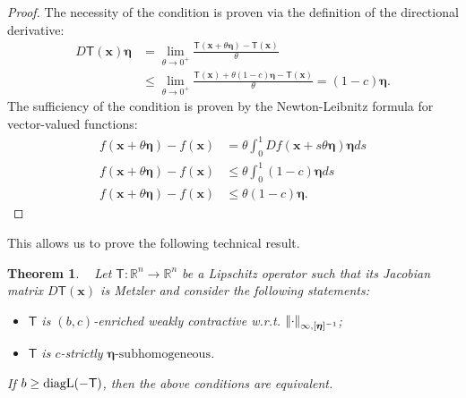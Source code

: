 \documentclass[journal,twoside,web]{ieeecolor}
\newcommand{\norm}[1]{{\left\vert\kern-0.25ex\left\vert #1\right\vert\kern-0.25ex\right\vert}}
\newcommand{\rea }{\mathbb{R}}
\newcommand{\xb}{\boldsymbol{x}}
\newcommand{\etab}{\boldsymbol{\eta}}
\newcommand{\Ts}{\mathsf{T}}
\newtheorem{thm}{Theorem}
\begin{document}
\begin{proof}
    The necessity of the condition is proven via the definition of the directional derivative:
    $$
    \begin{aligned}
    D\Ts(\xb)\etab & = \lim_{\theta\rightarrow 0^+} \frac{\Ts(\xb+\theta\etab) - \Ts(\xb)}{\theta}\\
    & \leq \lim_{\theta\rightarrow 0^+} \frac{\Ts(\xb) + \theta(1-c)\etab - \Ts(\xb)}{\theta} = (1-c)\etab.
    \end{aligned}
    $$
    The sufficiency of the condition is proven by the Newton-Leibnitz formula for vector-valued functions:
    $$
    \begin{aligned}
    f(\xb+\theta\etab) - f(\xb) & = \theta\int_0^1 Df(\xb + s\theta\etab) \etab ds\\
    f(\xb+\theta\etab) - f(\xb) & \leq \theta\int_0^1 (1-c)\etab ds\\
    f(\xb+\theta\etab) - f(\xb) & \leq \theta(1-c)\etab.
    \end{aligned}
    $$
\end{proof}

This allows us to prove the following technical result.
%
\begin{thm}\label{thm:monoKSPC}
~
Let $\Ts:\rea^n\rightarrow\rea^n$ be a Lipschitz operator such that its Jacobian matrix $D\Ts(\xb)$ is Metzler and consider the following statements:
%
\begin{itemize}
    \item[(i)] $\Ts$ is $(b,c)$-enriched weakly contractive w.r.t. $\norm{\cdot}_{\infty,[\etab]^{-1}}$;
    \item[(ii)] $\Ts$ is $c$-strictly $\etab\text{-subhomogeneous}$.
\end{itemize}
If $b\geq \textnormal{diagL}(-\Ts)$, then the above conditions are equivalent.
\end{thm}
\end{document}
